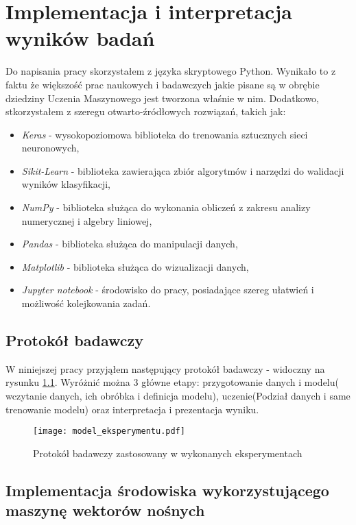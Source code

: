 \chapter{Implementacja i interpretacja wyników badań}

Do napisania pracy skorzystałem z języka skryptowego Python. Wynikało to z faktu że większość prac naukowych i badawczych jakie pisane są w obrębie dziedziny Uczenia Maszynowego jest tworzona właśnie w nim. Dodatkowo, stkorzystałem z szeregu otwarto-źródłowych rozwiązań, takich jak:
\begin{itemize}
	\item \textit{Keras}\cite{keras} - wysokopoziomowa biblioteka do trenowania sztucznych sieci neuronowych,
	\item \textit{Sikit-Learn} \cite{scikit} - biblioteka zawierająca zbiór algorytmów i narzędzi do walidacji wyników klasyfikacji,
	\item \textit{NumPy}  \cite{numpy} - biblioteka służąca do wykonania obliczeń z zakresu analizy numerycznej i algebry liniowej,
	\item \textit{Pandas}  \cite{pandas} - biblioteka służąca do manipulacji danych,
	\item \textit{Matplotlib}  \cite{matplotlib} - biblioteka służąca do wizualizacji danych,
	\item \textit{Jupyter notebook}  \cite{jupyter} - środowisko do pracy, posiadające szereg ułatwień i możliwość kolejkowania zadań.
\end{itemize}

\section{Protokół badawczy}

W niniejszej pracy przyjąłem następujący protokół badawczy - widoczny na rysunku \ref{fig:model_eks}. Wyróżnić można 3 główne etapy: przygotowanie danych i modelu( wczytanie danych, ich obróbka i definicja modelu), uczenie(Podział danych i same trenowanie modelu) oraz interpretacja i prezentacja wyniku.

\begin{figure}[h!]
	\texttt{[image: model\_eksperymentu.pdf]}
	\centering
	\caption{Protokół badawczy zastosowany w wykonanych eksperymentach}
	\label{fig:model_eks}
\end{figure}

\section{Implementacja środowiska  wykorzystującego maszynę wektorów nośnych}


